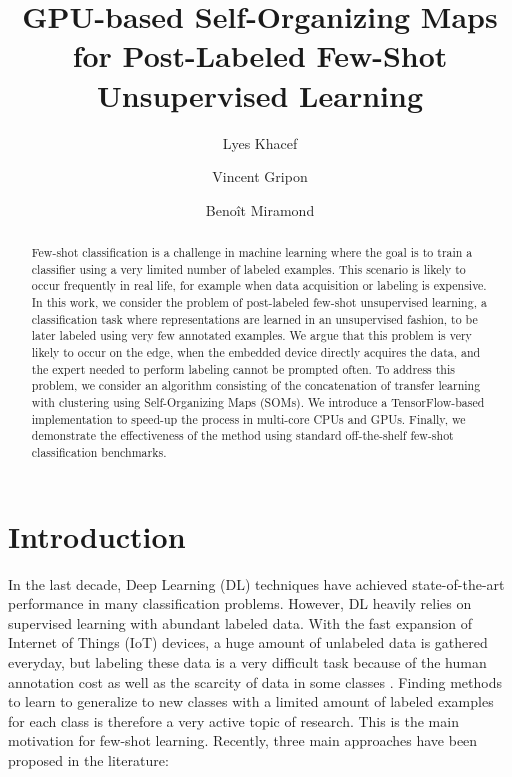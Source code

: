 \documentclass[runningheads]{llncs}
\begin{document}
\title{GPU-based Self-Organizing Maps for Post-Labeled Few-Shot Unsupervised Learning}

\author{Lyes Khacef \and
Vincent Gripon \and
Beno\^it Miramond}



\maketitle

\begin{abstract}
Few-shot classification is a challenge in machine learning where the goal is to train a classifier using a very limited number of labeled examples. This scenario is likely to occur frequently in real life, for example when data acquisition or labeling is expensive. In this work, we consider the problem of post-labeled few-shot unsupervised learning, a classification task where representations are learned in an unsupervised fashion, to be later labeled using very few annotated examples. We argue that this problem is very likely to occur on the edge, when the embedded device directly acquires the data, and the expert needed to perform labeling cannot be prompted often. To address this problem, we consider an algorithm consisting of the concatenation of transfer learning with clustering using Self-Organizing Maps (SOMs). We introduce a TensorFlow-based implementation to speed-up the process in multi-core CPUs and GPUs. Finally, we demonstrate the effectiveness of the method using standard off-the-shelf few-shot classification benchmarks.


\end{abstract}



\section{Introduction}

In the last decade, Deep Learning (DL) techniques have achieved state-of-the-art performance in many classification problems. However, DL heavily relies on supervised learning with abundant labeled data.
With the fast expansion of Internet of Things (IoT) devices, a huge amount of unlabeled data is gathered everyday, but labeling these data is a very difficult task because of the human annotation cost as well as the scarcity of data in some classes \cite{chen2019look_few_shot}. Finding methods to learn to generalize to new classes with a limited amount of labeled examples for each class is therefore a very active topic of research. This is the main motivation for few-shot learning.
Recently, three main approaches have been proposed in the literature:
\end{document}
